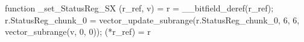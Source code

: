 function _set_StatusReg_SX (r_ref, v) = {
    r = __bitfield_deref(r_ref);
    r.StatusReg_chunk_0 = vector_update_subrange(r.StatusReg_chunk_0, 6, 6, vector_subrange(v, 0, 0));
    (*r_ref) = r
}
